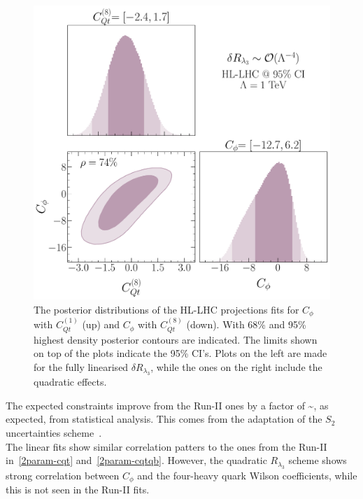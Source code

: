 \begin{figure}[htpb!]
\begin{center}
	\includegraphics[width=0.35\linewidth]{figures/hl-lhc/Cqt8_HL-LHC_quadl3_rge} 
\end{center}
\caption{The posterior distributions of the HL-LHC projections fits for $C_\phi$ with $C_{Qt}^{(1)}$ (up) and $C_\phi$ with $C_{Qt}^{(8)}$ (down). With 68\% and 95\% highest density posterior contours are indicated. The limits shown on top of the plots indicate the 95\% CI's. Plots on the left are made for the fully linearised $\delta R_{\lambda_3}$, while the ones on the right include the quadratic effects.  \label{2param-cqthl}   }
\end{figure}
The expected constraints improve from the Run-II ones by a factor of 
\be
\sim{},
\ee
as expected, from statistical analysis. This comes from the adaptation of the $S_2$ uncertainties scheme~\cite{Cepeda:2019klc}.  \\ The linear fits show similar correlation patters to the ones from the Run-II in~\autoref{2param-cqt} and~\autoref{2param-cqtqb}. However, the quadratic $R_{\lambda_3}$ scheme shows strong correlation between $C_\phi$ and the four-heavy quark Wilson coefficients, while this is not seen in the Run-II fits.
